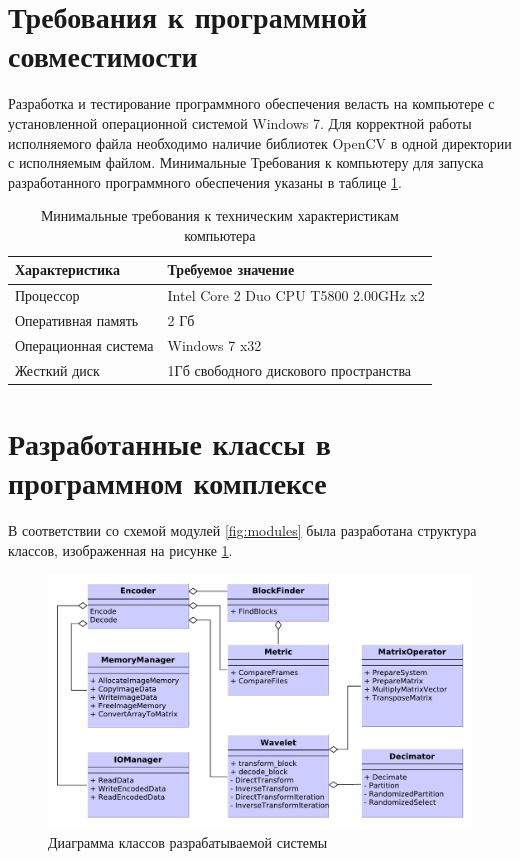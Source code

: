 \section{Требования к программной совместимости}
Разработка и тестирование программного обеспечения веласть на компьютере с установленной операционной системой Windows 7.
Для корректной работы исполняемого файла необходимо наличие библиотек OpenCV в одной директории с исполняемым файлом.
Минимальные Требования к компьютеру для запуска разработанного программного обеспечения указаны в таблице \ref{tab:comp}.

\begin{table}[ht]
  \caption{Минимальные требования к техническим характеристикам компьютера}
  \begin{tabular}{|p{5cm}|p{10cm}|}
  \hline
  Характеристика      & Требуемое значение \\
  \hline
  Процессор  &  Intel Core 2 Duo CPU T5800 2.00GHz x2\\
  \hline
  Оперативная память       & 2 Гб \\
  \hline
  Операционная система  & Windows 7 x32 \\
  \hline
  Жесткий диск  & 1Гб свободного дискового пространства \\
  \hline
  \end{tabular}
  \label{tab:comp}
\end{table}

\section{Разработанные классы в программном комплексе}
В соответствии со схемой модулей \ref{fig:modules} была разработана структура классов, изображенная на рисунке \ref{fig:classes}.

\begin{figure}
  \centering
  \includegraphics[scale=0.6]{inc/graphics/classes.pdf}
  \caption{Диаграмма классов разрабатываемой системы}
  \label{fig:classes}
\end{figure}

